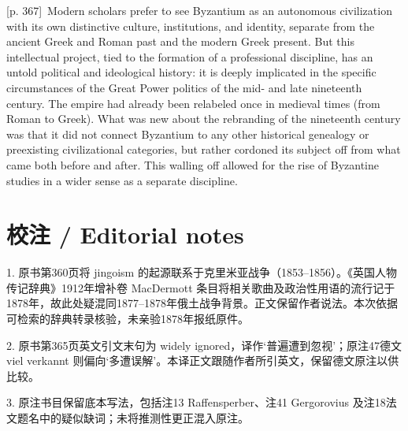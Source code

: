 \documentclass[10pt,a4paper]{article}
\begin{document}
{\scriptsize\color{gray}[p. 367]}\ Modern scholars prefer to see Byzantium as an autonomous civilization with its own distinctive culture, institutions, and identity, separate from the ancient Greek and Roman past and the modern Greek present. But this intellectual project, tied to the formation of a professional discipline, has an untold political and ideological history: it is deeply implicated in the specific circumstances of the Great Power politics of the mid- and late nineteenth century. The empire had already been relabeled once in medieval times (from Roman to Greek). What was new about the rebranding of the nineteenth century was that it did not connect Byzantium to any other historical genealogy or preexisting civilizational categories, but rather cordoned its subject off from what came both before and after. This walling off allowed for the rise of Byzantine studies in a wider sense as a separate discipline.\par
{}\section*{校注 / Editorial notes}
1. 原书第360页将 jingoism 的起源联系于克里米亚战争（1853–1856）。《英国人物传记辞典》1912年增补卷 MacDermott 条目将相关歌曲及政治性用语的流行记于1878年，故此处疑混同1877–1878年俄土战争背景。正文保留作者说法。本次依据可检索的辞典转录核验，未亲验1878年报纸原件。\par
2. 原书第365页英文引文末句为 widely ignored，译作‘普遍遭到忽视’；原注47德文 viel verkannt 则偏向‘多遭误解’。本译正文跟随作者所引英文，保留德文原注以供比较。\par
3. 原注书目保留底本写法，包括注13 Raffensperber、注41 Gergorovius 及注18法文题名中的疑似缺词；未将推测性更正混入原注。\par
\end{document}
